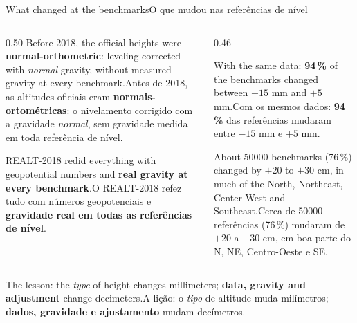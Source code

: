 \documentclass[aspectratio=169,11pt]{beamer}
\newcommand{\tr}[2]{\ifEN#2\else#1\fi}
\newcommand{\bnum}[1]{\textbf{\textcolor{mTeal}{#1}}}
\begin{document}
\begin{frame}{\tr{O que mudou nas referências de nível}{What changed at the benchmarks}}
  \begin{columns}[T]
    \begin{column}{0.50\textwidth}
      \small
      \tr{Antes de 2018, as altitudes oficiais eram \textbf{normais-ortométricas}: o
      nivelamento corrigido com a gravidade \emph{normal}, sem gravidade medida em toda
      referência de nível.}{Before 2018, the official heights were \textbf{normal-orthometric}:
      leveling corrected with \emph{normal} gravity, without measured gravity at every
      benchmark.}
      \medskip

      \tr{O REALT-2018 refez tudo com números geopotenciais e \bnum{gravidade real em todas as
      referências de nível}.}{REALT-2018 redid everything with geopotential numbers and
      \bnum{real gravity at every benchmark}.}
    \end{column}
    \begin{column}{0.46\textwidth}
      \begin{regra}[title={\tr{Só trocar o tipo de altitude}{Only changing the type of
        height}}]
        \footnotesize\tr{Com os mesmos dados: \bnum{94\,\%} das referências mudaram entre $-15$ mm e
        $+5$ mm.}{With the same data: \bnum{94\,\%} of the benchmarks changed between $-15$ mm
        and $+5$ mm.}
      \end{regra}
      \medskip
      \begin{cuidado}[title={\tr{O reajustamento inteiro}{The whole readjustment}}]
        \footnotesize\tr{Cerca de \alert{\num{50000}} referências (76\,\%) mudaram de \alert{$+20$ a
        $+30$ cm}, em boa parte do N, NE, Centro-Oeste e SE.}{About \alert{\num{50000}}
        benchmarks (76\,\%) changed by \alert{$+20$ to $+30$ cm}, in much of the North,
        Northeast, Center-West and Southeast.}
      \end{cuidado}
    \end{column}
  \end{columns}
  \smallskip
  \centering
  \small
  \tr{A lição: o \emph{tipo} de altitude muda milímetros; \bnum{dados, gravidade e ajustamento}
  mudam decímetros.}{The lesson: the \emph{type} of height changes millimeters; \bnum{data,
  gravity and adjustment} change decimeters.}
\end{frame}
\end{document}
